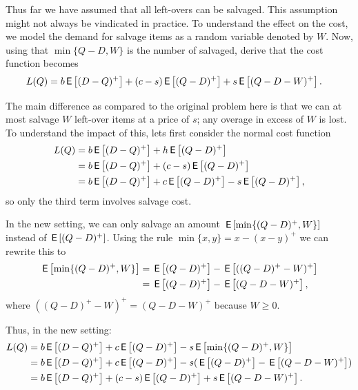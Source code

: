\begin{exercise}  Thus far we have assumed that all left-overs can be salvaged. This assumption might not always be vindicated in practice. To understand the effect on the cost, we model the demand for salvage items as a random variable denoted by $W$. Now, using that  $\min\{Q-D, W\}$ is the number of  salvaged, derive that the cost function becomes
\begin{align*}
L(Q) 
 &= b\,\mathsf{E}\left[(D-Q)^+\right] + (c-s) \,\mathsf{E}\left[(Q-D)^+\right] + s \,\mathsf{E}\left[(Q-D- W)^+\right].
\end{align*}
\begin{solution}
The main difference as compared to the original problem here is that we can at most salvage $W$ left-over items at a price of $s$; any overage in excess of $W$ is lost. To understand the impact of this, lets first consider the normal cost function
\begin{align*}
   L(Q) 
 &= b\,\mathsf{E}\left[(D-Q)^+\right] + h \,\mathsf{E}\left[(Q-D)^+\right] \\
 &= b\,\mathsf{E}\left[(D-Q)^+\right] + (c-s) \,\mathsf{E}\left[(Q-D)^+\right] \\
 &= b\,\mathsf{E}\left[(D-Q)^+\right] + c\,\mathsf{E}\left[(Q-D)^+\right] - s\,\mathsf{E}\left[(Q-D)^+\right],
 \end{align*}
so only the third term involves salvage cost. 

In the new setting, we can only salvage an amount $\,\mathsf{E}\left[\min\{(Q-D)^+, W\}\right]$ instead of $\,\mathsf{E}\left[(Q-D)^+\right]$. Using the rule $\min\{x, y\} = x - (x-y)^+$ we can rewrite this to
\begin{align*}
\,\mathsf{E}\left[\min\{(Q-D)^+, W\}\right] 
&=  \,\mathsf{E}\left[(Q-D)^+\right] - \,\mathsf{E}\left[((Q-D)^+- W)^+\right] \\
&=  \,\mathsf{E}\left[(Q-D)^+\right] - \,\mathsf{E}\left[(Q-D- W)^+\right],
\end{align*}
where $((Q-D)^+-W)^+=(Q-D-W)^+$ because $W\geq 0$. 

Thus, in the new setting:
\begin{align*}
  L(Q) 
 &= b\,\mathsf{E}\left[(D-Q)^+\right] + c \,\mathsf{E}\left[(Q-D)^+\right] - s\,\mathsf{E}\left[\min\{(Q-D)^+, W\}\right] \\
 &= b\,\mathsf{E}\left[(D-Q)^+\right] + c \,\mathsf{E}\left[(Q-D)^+\right] - s (\,\mathsf{E}\left[(Q-D)^+\right] - \,\mathsf{E}\left[(Q-D- W)^+\right]) \\
 &= b\,\mathsf{E}\left[(D-Q)^+\right] + (c-s) \,\mathsf{E}\left[(Q-D)^+\right] + s \,\mathsf{E}\left[(Q-D- W)^+\right].
\end{align*}
\end{solution}
\end{exercise}

